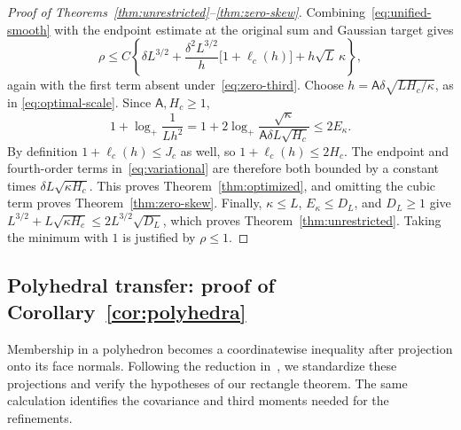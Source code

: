 \documentclass[11pt,letterpaper]{article}
\theoremstyle{remark}
\begin{document}
\begin{proof}[Proof of Theorems~\ref{thm:unrestricted}--\ref{thm:zero-skew}]
Combining~\eqref{eq:unified-smooth} with the endpoint estimate at
the original sum and Gaussian target gives
\begin{equation}
 \rho\le C\left\{\delta L^{3/2}
  +\frac{\delta^2L^{3/2}}h
      \bigl[1+\ell_c(h)\bigr]
  +h\sqrt L\,\kappa\right\},
 \label{eq:variational}
\end{equation}
again with the first term absent under~\eqref{eq:zero-third}.
Choose \(h=\mathsf A\delta\sqrt{LH_c/\kappa}\), as in
\eqref{eq:optimal-scale}. Since \(\mathsf A,H_c\ge1\),
\[
 1+\log_+\frac1{Lh^2}
 =1+2\log_+\frac{\sqrt\kappa}{\mathsf A\delta L\sqrt{H_c}}
 \le2E_\kappa.
\]
By definition \(1+\ell_c(h)\le J_c\) as well, so
\(1+\ell_c(h)\le2H_c\). The endpoint and fourth-order terms
in~\eqref{eq:variational} are therefore both bounded by a constant
times \(\delta L\sqrt{\kappa H_c}\).
This proves Theorem~\ref{thm:optimized}, and omitting the cubic term
proves Theorem~\ref{thm:zero-skew}. Finally,
\(\kappa\le L\), \(E_\kappa\le D_L\), and \(D_L\ge1\) give
\(L^{3/2}+L\sqrt{\kappa H_c}\le2L^{3/2}\sqrt{D_L}\),
which proves Theorem~\ref{thm:unrestricted}. Taking the minimum
with \(1\) is justified by \(\rho\le1\).
\end{proof}

\subsection{\texorpdfstring{Polyhedral transfer: proof of Corollary~\ref{cor:polyhedra}}{Polyhedral transfer: proof of Corollary 2}}
\label{app:polyhedral-transfer}

Membership in a polyhedron becomes a coordinatewise inequality after
projection onto its face normals. Following the reduction
in~\cite[Section~3.1]{CCK2017}, we standardize these projections and
verify the hypotheses of our rectangle theorem. The same calculation
identifies the covariance and third moments needed for the refinements.
\end{document}
